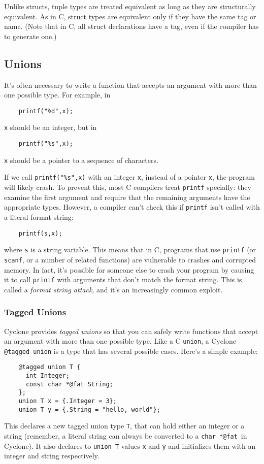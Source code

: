 Unlike structs, tuple types are treated equivalent as long as they are
structurally equivalent.  As in C, struct types are equivalent only if
they have the same tag or name.  (Note that in C, all struct
declarations have a tag, even if the compiler has to generate one.)


\subsection{Unions}

It's often necessary to write a function that accepts an argument with
more than one possible type.  For example, in
\begin{verbatim}
    printf("%d",x);
\end{verbatim}
\texttt{x} should be an integer, but in
\begin{verbatim}
    printf("%s",x);
\end{verbatim}
\texttt{x} should be a pointer to a sequence of characters.

If we call \texttt{printf("\%s",x)} with an integer \texttt{x},
instead of a pointer \texttt{x}, the program will likely crash.
To prevent this, most C compilers treat \texttt{printf} specially:
they examine the first argument and require that the remaining
arguments have the appropriate types.  However, a compiler can't check
this if \texttt{printf} isn't called with a literal format string:
\begin{verbatim}
    printf(s,x);
\end{verbatim}
where \texttt{s} is a string variable.  This means that in C, programs
that use \texttt{printf} (or \texttt{scanf}, or a number of related
functions) are vulnerable to crashes and corrupted memory.  In fact,
it's possible for someone else to crash your program by causing it to
call \texttt{printf} with arguments that don't match the format
string.  This is called a \emph{format string attack}, and it's an
increasingly common exploit.

\subsubsection*{Tagged Unions}

Cyclone provides \emph{tagged unions} so that you can safely write
functions that accept an argument with more than one possible type.
Like a C \texttt{union}, a Cyclone \texttt{@tagged union} is a type that has
several possible cases.  Here's a simple example:
\begin{verbatim}
    @tagged union T {
      int Integer;
      const char *@fat String;
    };
    union T x = {.Integer = 3};
    union T y = {.String = "hello, world"};
\end{verbatim}
This declares a new tagged union type \texttt{T}, that can hold either an
integer or a string (remember, a literal string can always be
converted to a \texttt{char *@fat}\ in
Cyclone).  It also declares to \texttt{union T} values \texttt{x} and
\texttt{y} and initializes them with an integer and string respectively.


